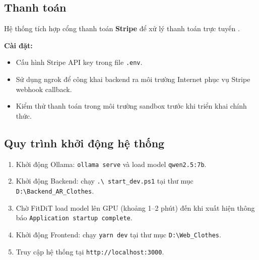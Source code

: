 \subsection{Thanh toán}
Hệ thống tích hợp cổng thanh toán \textbf{Stripe} để xử lý 
thanh toán trực tuyến \cite{stripe_docs}.

\textbf{Cài đặt:}
\begin{itemize}[noitemsep]
    \item Cấu hình Stripe API key trong file \texttt{.env}.
    \item Sử dụng ngrok để công khai backend ra môi trường 
    Internet phục vụ Stripe webhook callback.
    \item Kiểm thử thanh toán trong môi trường sandbox trước 
    khi triển khai chính thức.
\end{itemize}

\subsection{Quy trình khởi động hệ thống}
\begin{enumerate}[noitemsep]
    \item Khởi động Ollama: \texttt{ollama serve} và load model 
    \texttt{qwen2.5:7b}.
    \item Khởi động Backend: chạy \texttt{.\textbackslash 
    start\_dev.ps1} tại thư mục 
    \texttt{D:\textbackslash Backend\_AR\_Clothes}.
    \item Chờ FitDiT load model lên GPU (khoảng 1--2 phút) 
    đến khi xuất hiện thông báo 
    \texttt{Application startup complete}.
    \item Khởi động Frontend: chạy \texttt{yarn dev} tại thư 
    mục \texttt{D:\textbackslash Web\_Clothes}.
    \item Truy cập hệ thống tại 
    \texttt{http://localhost:3000}.
\end{enumerate}
